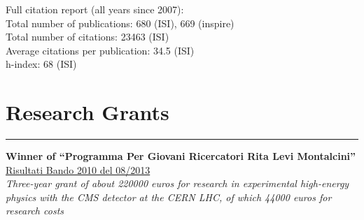 \documentclass[10pt, a4paper]{article}
\newcommand{\years}[1]{\marginnote{\hskip-0.2in{\small #1}}}
\begin{document}
Full citation report (all years since 2007):\\
Total number of publications: 680 (ISI), 669 (inspire) \\
Total number of citations: 23463 (ISI) \\
Average citations per publication: 34.5 (ISI) \\
h-index: 68 (ISI) 

\section*{Research Grants}
\vspace{-5pt}
\hrule
\vspace{10pt}
\years{03/2014}\textbf{Winner of ``Programma Per Giovani
  Ricercatori Rita Levi Montalcini''} \\ 
 \href{http://cervelli.cineca.it/ProgGiovRic/dm050813_683.pdf}{Risultati
   Bando 2010 del 08/2013} \\
\emph{Three-year grant of about 220000 euros for research in experimental high-energy
  physics with the CMS detector at the CERN LHC, of which 44000 euros for research costs}
\end{document}
